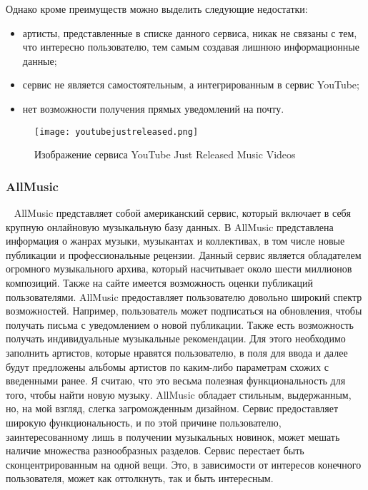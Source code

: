 Однако кроме преимуществ можно выделить следующие недостатки:

\begin{itemize}
  \item артисты, представленные в списке данного сервиса, никак не связаны с тем, что интересно пользователю, тем самым создавая лишнюю информационные данные;
  \item сервис не является самостоятельным, а интегрированным в сервис YouTube;
  \item нет возможности получения прямых уведомлений на почту.
\end{itemize}

\begin{figure}[ht]
\centering
  \texttt{[image: youtubejustreleased.png]}
  \caption{ Изображение сервиса YouTube Just Released Music Videos }
  \label{fig:domain:youtube_just_released_music_videos:picture}
\end{figure}

\subsubsection{AllMusic}
\label{sub:domain:analogues_review:allmusic}
~\newline
\indent AllMusic представляет собой американский сервис, который включает в себя крупную онлайновую музыкальную базу данных. В AllMusic представлена информация о жанрах музыки, музыкантах и коллективах, в том числе новые публикации и профессиональные рецензии. Данный сервис является обладателем огромного музыкального архива, который насчитывает около шести миллионов композиций. Также на сайте имеется возможность оценки публикаций пользователями.
AllMusic предоставляет пользователю довольно широкий спектр возможностей. Например, пользователь может подписаться на обновления, чтобы получать письма с уведомлением о новой публикации. Также есть возможность получать индивидуальные музыкальные рекомендации. Для этого необходимо заполнить артистов, которые нравятся пользователю, в поля для ввода и далее будут предложены альбомы артистов по каким-либо параметрам схожих с введенными ранее. Я считаю, что это весьма полезная функциональность для того, чтобы найти новую музыку.
AllMusic обладает стильным, выдержанным, но, на мой взгляд, слегка загроможденным дизайном. Сервис предоставляет широкую функциональность, и по этой причине пользователю, заинтересованному лишь в получении музыкальных новинок, может мешать наличие множества разнообразных разделов. Сервис перестает быть сконцентрированным на одной вещи. Это, в зависимости от интересов конечного пользователя, может как оттолкнуть, так и быть интересным.

